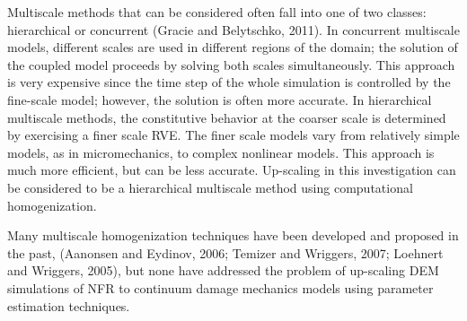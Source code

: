 Multiscale methods that can be considered often fall into one of two classes: hierarchical or concurrent (Gracie and Belytschko, 2011). In concurrent multiscale models, different scales are used in different regions of the domain; the solution of the coupled model proceeds by solving both scales simultaneously. This approach is very expensive since the time step of the whole simulation is controlled by the fine-scale model; however, the solution is often more accurate. In hierarchical multiscale methods, the constitutive behavior at the coarser scale is determined by exercising a finer scale RVE. The finer scale models vary from relatively simple models, as in micromechanics, to complex nonlinear models. This approach is much more efficient, but can be less accurate. Up-scaling in this investigation can be considered to be a hierarchical multiscale method using computational homogenization. 

Many multiscale homogenization techniques have been developed and proposed in the past, (Aanonsen and Eydinov, 2006; Temizer and Wriggers, 2007; Loehnert and Wriggers, 2005), but none have addressed the problem of up-scaling DEM simulations of  NFR to continuum damage mechanics models using parameter estimation techniques.
